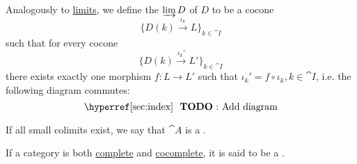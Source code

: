 \begin{definition}\label{def:categorical_colimit}\mcite\cite[def. 5.1.19(b)]{Leinster2016Basic}
  Analogously to \hyperref[def:categorical_limit]{limits}, we define the  \( \varinjlim D \) of \( D \) to be a cocone
  \begin{equation*}
    \{ D(k) \overset {\iota_k} \to L \}_{k \in \cat{I}}
  \end{equation*}
  such that for every cocone
  \begin{equation*}
    \{ D(k) \overset {\iota_k'} \to L' \}_{k \in \cat{I}}
  \end{equation*}
  there exists exactly one morphism \( f: L \to L' \) such that \( \iota_k' = f \circ \iota_k, k \in \cat{I} \), i.e. the following diagram commutes:
  \begin{equation*}
    \text{\todo{Add diagram}}\iffalse\begin{mplibcode}
      beginfig(1);
      input metapost/graphs;

      v1 := thelabel("$D(k)$", origin);
      v2 := thelabel("$L'$", (-1, -1) scaled u);
      v3 := thelabel("$L$", (1, -1) scaled u);

      a1 := straight_arc(v1, v2);
      a2 := straight_arc(v1, v3);

      d1 := straight_arc(v3, v2);

      draw_vertices(v);
      draw_arcs(a);

      drawarrow d1 dotted;

      label.ulft("$\iota_k'$", straight_arc_midpoint of a1);
      label.urt("$\iota_k$", straight_arc_midpoint of a2);
      label.top("$f$", straight_arc_midpoint of d1);
      endfig;
    \end{mplibcode}\fi
  \end{equation*}

  If all small colimits exist, we say that \( \cat{A} \) is a .
\end{definition}

\begin{definition}\label{def:cocomplete_category}
  If a category is both \hyperref[def:categorical_limit]{complete} and \hyperref[def:categorical_colimit]{cocomplete}, it is said to be a .
\end{definition}


